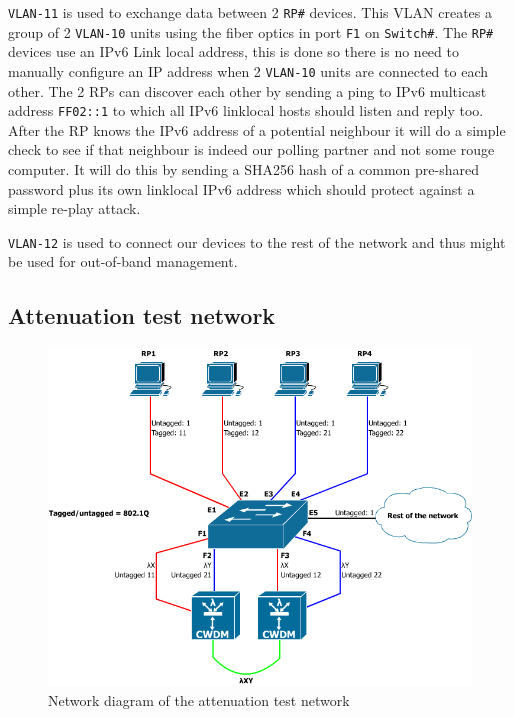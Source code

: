 \documentclass{article}
\begin{document}
\texttt{VLAN-11} is used to exchange data between 2 \texttt{RP\#} devices. This VLAN creates a group of 2 \texttt{VLAN-10} units using the fiber optics in port \texttt{F1} on \texttt{Switch\#}. The \texttt{RP\#} devices use an IPv6 Link local address, this is done so there is no need to manually configure an IP address when 2 \texttt{VLAN-10} units are connected to each other. The 2 RPs can discover each other by sending a ping to IPv6 multicast address \texttt{FF02::1} to which all IPv6 linklocal hosts should listen and reply too\cite{ietf:rfc4291}. After the RP knows the IPv6 address of a potential neighbour it will do a simple check to see if that neighbour is indeed our polling partner and not some rouge computer. It will do this by sending a SHA256 hash of a common pre-shared password plus its own linklocal IPv6 address which should protect against a simple re-play attack.

\texttt{VLAN-12} is used to connect our devices to the rest of the network and thus might be used for out-of-band management.


\subsection{Attenuation test network}

\begin{figure}[h]
\centerline{\includegraphics[scale=0.4, trim = 0mm 0mm 0mm 0mm]{images/CWDM.png}}
\caption{Network diagram of the attenuation test network}
\label{fig:CWDM}
\end{figure}
\end{document}
